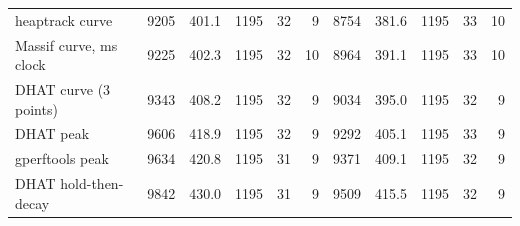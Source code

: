 \begin{tabular}{lrrrrrrrrrr}
heaptrack curve & 9205 & 401.1 & 1195 & 32 & 9 & 8754 & 381.6 & 1195 & 33 & 10 \\
Massif curve, ms clock & 9225 & 402.3 & 1195 & 32 & 10 & 8964 & 391.1 & 1195 & 33 & 10 \\
DHAT curve (3 points) & 9343 & 408.2 & 1195 & 32 & 9 & 9034 & 395.0 & 1195 & 32 & 9 \\
DHAT peak & 9606 & 418.9 & 1195 & 32 & 9 & 9292 & 405.1 & 1195 & 33 & 9 \\
gperftools peak & 9634 & 420.8 & 1195 & 31 & 9 & 9371 & 409.1 & 1195 & 32 & 9 \\
DHAT hold-then-decay & 9842 & 430.0 & 1195 & 31 & 9 & 9509 & 415.5 & 1195 & 32 & 9 \\
\bottomrule
\end{tabular}
